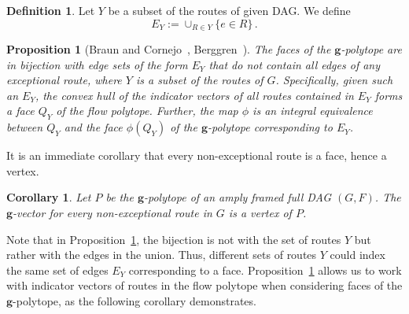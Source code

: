 \documentclass[12pt]{amsart}
\newtheorem{proposition}[theorem]{Proposition}
\newtheorem{corollary}[theorem]{Corollary}
\theoremstyle{definition}
\newtheorem{definition}[theorem]{Definition}
\newcommand\bg{\mathbf{g}}
\begin{document}
\begin{definition}
    Let $Y$ be a subset of the routes of given DAG. We define 
    \[
    E_Y :=\cup_{R\in Y}\{e\in R\} \, .
    \]
\end{definition}

\begin{proposition}[Braun and Cornejo~\cite{BraunCornejo}, Berggren~\cite{Berggren}]\label{prop:faces-edge-sets}
    The faces of the $\bg$-polytope are in bijection with edge sets of the form $E_Y$ that do not contain all edges of any exceptional route, where $Y$ is a subset of the routes of $G$.
    Specifically, given such an $E_Y$, the convex hull of the indicator vectors of all routes contained in $E_Y$ forms a face $Q_Y$ of the flow polytope. 
    Further, the map $\phi$ is an integral equivalence between $Q_Y$ and the face $\phi(Q_Y)$ of the $\bg$-polytope corresponding to $E_Y$.
\end{proposition}

It is an immediate corollary that every non-exceptional route is a face, hence a vertex.

\begin{corollary}
    \label{cor:vertices}
    Let $P$ be the $\bg$-polytope of an amply framed full DAG $(G,F)$.
    The $\bg$-vector for every non-exceptional route in $G$ is a vertex of $P$.
\end{corollary}

Note that in Proposition~\ref{prop:faces-edge-sets}, the bijection is not with the set of routes $Y$ but rather with the edges in the union.
Thus, different sets of routes $Y$ could index the same set of edges $E_Y$ corresponding to a face.
Proposition~\ref{prop:faces-edge-sets} allows us to work with indicator vectors of routes in the flow polytope when considering faces of the $\bg$-polytope, as the following corollary demonstrates.
\end{document}
